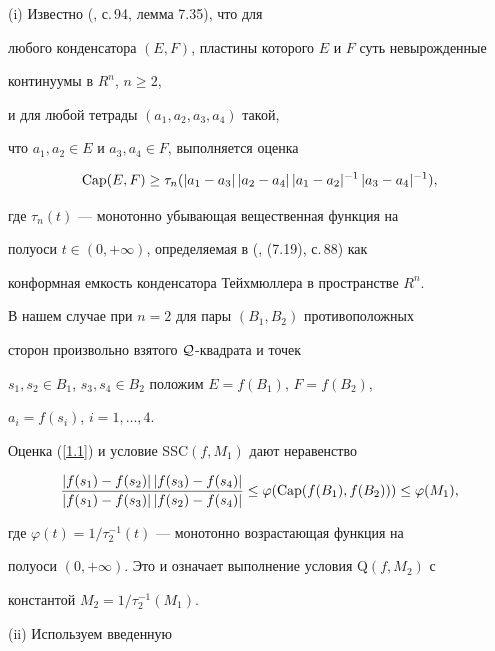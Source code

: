 \begin{pf}


(i) Известно (\cite{Vu}, с.\,94, лемма 7.35), что для 


любого конденсатора $(E,F)$, пластины которого $E$ и $F$ суть невырожденные 


континуумы в $R^n$, $n\geq 2$,


и для любой тетрады $(a_1, a_2, a_3, a_4)$ такой, 


что $a_1, a_2 \in E$ и $a_3, a_4 \in F$, выполняется оценка


\begin{equation}


\label{1.1}


\Capp(E,F) \geq \tau_n( |a_1 - a_3|\,


|a_2 - a_4| \, |a_1 - a_2|^{-1}\, |a_3 - a_4|^{-1}),


\end{equation}


где $\tau_n(t)$ --- монотонно убывающая вещественная функция на 


полуоси $t\in (0,+\infty)$, определяемая в (\cite{Vu}, (7.19), с.\,88) как 


конформная емкость конденсатора Тейхмюллера в пространстве $R^n$. 


В нашем случае при $n=2$ для пары $(B_1, B_2)$ противоположных 


сторон произвольно взятого ${\cal Q}$-квадрата и точек 


$s_1, s_2 \in B_1$, $s_3, s_4 \in B_2$ положим $E=f(B_1)$, $F=f(B_2)$, 


$a_i = f(s_i)$, $i=1,\dotsc,4$.


Оценка (\ref{1.1}) и условие SSC$(f,M_1)$ дают неравенство


$$


\frac{ |f(s_1) - f(s_2)|\, |f(s_3) - f(s_4)|} 


{|f(s_1) - f(s_3)|\, |f(s_2) - f(s_4)|} \leq 


\varphi (\Capp(f(B_1),f(B_2))) \leq \varphi(M_1),


$$ 


где $\varphi(t) = 1/\tau_{2}^{-1}(t)$ --- монотонно возрастающая функция на 


полуоси $(0, +\infty)$. Это и означает выполнение условия Q$(f, M_2)$ с 


константой $M_2 = 1/\tau_{2}^{-1}(M_1)$.





(ii) Используем введенную 



\end{pf}
